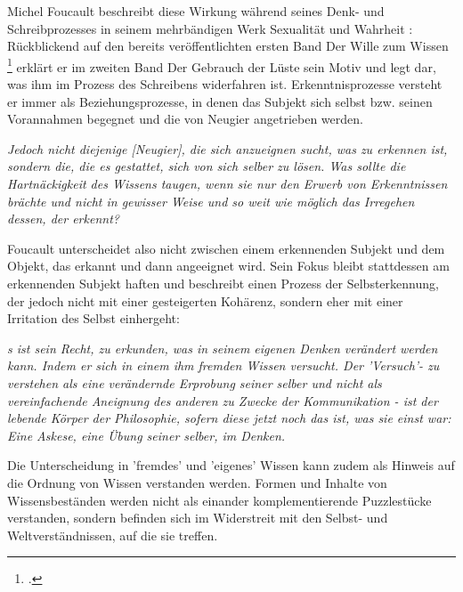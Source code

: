  Michel
Foucault beschreibt diese Wirkung während seines Denk- und Schreibprozesses in
seinem mehrbändigen Werk \glqq Sexualität und Wahrheit\grqq\footnotemark
{}: Rückblickend auf den
bereits veröffentlichten ersten Band \glqq Der Wille zum Wissen \grqq
\footnotemark \footcitetext{foucault} erklärt er im
zweiten Band \glqq Der Gebrauch der Lüste\grqq\footnotemark
{} sein Motiv und legt dar, was ihm im
Prozess des Schreibens widerfahren ist. Erkenntnisprozesse versteht er immer als Beziehungsprozesse, in denen das Subjekt sich selbst bzw. seinen Vorannahmen begegnet und die von Neugier angetrieben werden.
\begin{myenv}
  \textit{Jedoch \glqq [...] nicht diejenige [Neugier], die sich anzueignen
  sucht, was zu erkennen ist, sondern die, die es gestattet, sich von sich
selber zu lösen. Was sollte die Hartnäckigkeit des Wissens taugen, wenn sie nur
den Erwerb von Erkenntnissen brächte und nicht in gewisser Weise und so weit
wie möglich das Irregehen dessen, der erkennt?\grqq} \footnotemark
{}
\end{myenv}
Foucault unterscheidet also nicht zwischen einem erkennenden Subjekt und dem Objekt, das erkannt und dann angeeignet wird. Sein Fokus bleibt stattdessen am erkennenden Subjekt haften und beschreibt einen Prozess der Selbsterkennung, der jedoch nicht mit einer gesteigerten Kohärenz, sondern eher mit einer Irritation des Selbst einhergeht: 
\begin{myenv}
  \textit{ 
    \glqq [E]s ist sein Recht, zu erkunden, was in seinem eigenen Denken verändert
    werden kann. Indem er sich in einem ihm fremden Wissen versucht. Der
    'Versuch'- zu verstehen als eine verändernde Erprobung seiner selber und 
    nicht als vereinfachende Aneignung des anderen zu Zwecke der Kommunikation
    - ist der lebende Körper der Philosophie, sofern diese jetzt noch das ist,
    was sie einst war: Eine Askese, eine Übung seiner selber, im Denken.\grqq\footnotemark
  }
\end{myenv}
Die Unterscheidung in 'fremdes' und 'eigenes' 
Wissen kann zudem als Hinweis auf die Ordnung von Wissen verstanden werden. Formen und Inhalte von Wissensbeständen werden nicht als einander komplementierende Puzzlestücke verstanden, sondern befinden sich im Widerstreit mit den Selbst- und Weltverständnissen, auf die sie treffen.\\

